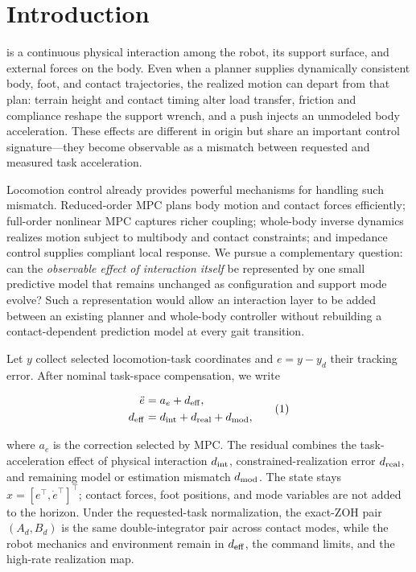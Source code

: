 \documentclass[journal]{IEEEtran}
\theoremstyle{plain}
\theoremstyle{definition}
\begin{document}
\section{Introduction}\label{sec:introduction}

 is a continuous physical interaction among the robot, its support surface, and external forces on the body. Even when a planner supplies dynamically consistent body, foot, and contact trajectories, the realized motion can depart from that plan: terrain height and contact timing alter load transfer, friction and compliance reshape the support wrench, and a push injects an unmodeled body acceleration. These effects are different in origin but share an important control signature---they become observable as a mismatch between requested and measured task acceleration.

Locomotion control already provides powerful mechanisms for handling such mismatch. Reduced-order MPC plans body motion and contact forces efficiently; full-order nonlinear MPC captures richer coupling; whole-body inverse dynamics realizes motion subject to multibody and contact constraints; and impedance control supplies compliant local response. We pursue a complementary question: can the \emph{observable effect of interaction itself} be represented by one small predictive model that remains unchanged as configuration and support mode evolve? Such a representation would allow an interaction layer to be added between an existing planner and whole-body controller without rebuilding a contact-dependent prediction model at every gait transition.

Let \(y\) collect selected locomotion-task coordinates and \(e=y-y_d\) their tracking error. After nominal task-space compensation, we write

\[
\begin{aligned}
\ddot e
&=a_e+d_{\rm eff},\\
d_{\rm eff}
&=d_{\rm int}+d_{\rm real}+d_{\rm mod},
\end{aligned}
\tag{1}
\]

where \(a_e\) is the correction selected by MPC. The residual combines the task-acceleration effect of physical interaction \(d_{\rm int}\), constrained-realization error \(d_{\rm real}\), and remaining model or estimation mismatch \(d_{\rm mod}\). The state stays \(x=[e^\top,\dot e^\top]^\top\); contact forces, foot positions, and mode variables are not added to the horizon. Under the requested-task normalization, the exact-ZOH pair \((A_d,B_d)\) is the same double-integrator pair across contact modes, while the robot mechanics and environment remain in \(d_{\rm eff}\), the command limits, and the high-rate realization map.
\end{document}
